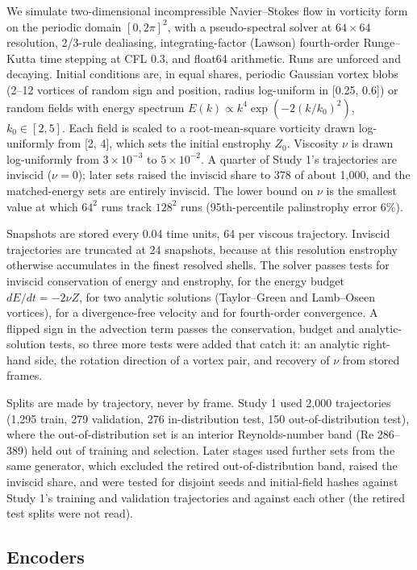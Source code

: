 \documentclass[10pt]{article}
\begin{document}
We simulate two-dimensional incompressible Navier--Stokes flow in vorticity form on the periodic domain $[0, 2\pi]^2$, with a pseudo-spectral solver at $64 \times 64$ resolution, 2/3-rule dealiasing, integrating-factor (Lawson) fourth-order Runge--Kutta time stepping at CFL 0.3, and float64 arithmetic. Runs are unforced and decaying. Initial conditions are, in equal shares, periodic Gaussian vortex blobs (2--12 vortices of random sign and position, radius log-uniform in [0.25, 0.6]) or random fields with energy spectrum $E(k) \propto k^4 \exp(-2(k/k_0)^2)$, $k_0 \in [2, 5]$. Each field is scaled to a root-mean-square vorticity drawn log-uniformly from [2, 4], which sets the initial enstrophy $Z_0$. Viscosity $\nu$ is drawn log-uniformly from $3\times10^{-3}$ to $5\times10^{-2}$. A quarter of Study 1's trajectories are inviscid ($\nu = 0$); later sets raised the inviscid share to 378 of about 1,000, and the matched-energy sets are entirely inviscid. The lower bound on $\nu$ is the smallest value at which $64^2$ runs track $128^2$ runs (95th-percentile palinstrophy error 6\%).

Snapshots are stored every 0.04 time units, 64 per viscous trajectory. Inviscid trajectories are truncated at 24 snapshots, because at this resolution enstrophy otherwise accumulates in the finest resolved shells. The solver passes tests for inviscid conservation of energy and enstrophy, for the energy budget $dE/dt = -2\nu Z$, for two analytic solutions (Taylor--Green and Lamb--Oseen vortices), for a divergence-free velocity and for fourth-order convergence. A flipped sign in the advection term passes the conservation, budget and analytic-solution tests, so three more tests were added that catch it: an analytic right-hand side, the rotation direction of a vortex pair, and recovery of $\nu$ from stored frames.

Splits are made by trajectory, never by frame. Study 1 used 2,000 trajectories (1,295 train, 279 validation, 276 in-distribution test, 150 out-of-distribution test), where the out-of-distribution set is an interior Reynolds-number band ($\mathrm{Re}$ 286--389) held out of training and selection. Later stages used further sets from the same generator, which excluded the retired out-of-distribution band, raised the inviscid share, and were tested for disjoint seeds and initial-field hashes against Study 1's training and validation trajectories and against each other (the retired test splits were not read).

\subsection{Encoders}\label{sec:3.2}
\end{document}
